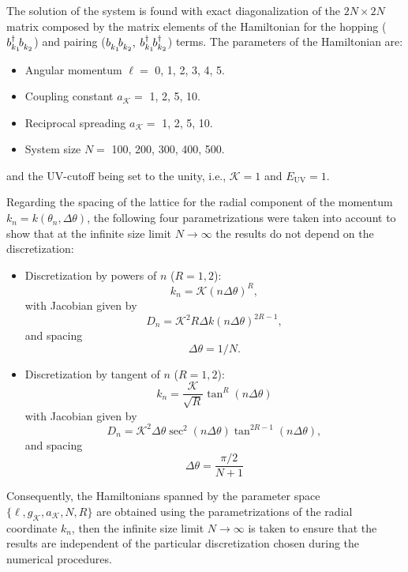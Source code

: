 \documentclass[english,aps,prd,nofootinbib,twocolumn]{revtex4-1}
\begin{document}
The solution of the system is found with exact diagonalization of the $2N\times 2N$ matrix composed by the matrix elements of the Hamiltonian for the hopping ($b^{\textcolor{black}{\dagger}}_{k_{1}}\!b^{\textcolor{white}{\dagger}}_{k_{2}}$) and pairing ($b^{\textcolor{white}{\dagger}}_{k_{1}}\!b^{\textcolor{white}{\dagger}}_{k_{2}},$ $b^{\textcolor{black}{\dagger}}_{k_{1}}\!b^{\textcolor{black}{\dagger}}_{k_{2}}$) terms. The parameters of the Hamiltonian are:
\begin{itemize}
\item Angular momentum $\ell=$ 0, 1, 2, 3, 4, 5.
\item Coupling constant $a_{\mathcal{K}}=$ 1, 2, 5, 10.
\item Reciprocal spreading $a_{\mathcal{K}}=$ 1, 2, 5, 10.
\item System size $N=$ 100, 200, 300, 400, 500.
\end{itemize}
and the UV-cutoff being set to the unity, i.e., $\mathcal{K}=1$ and $E_{\mathrm{UV}}=1$.

Regarding the spacing of the lattice for the radial component of the momentum $k_{n}=k(\theta_{n},\Delta \theta)$, the following four parametrizations were taken into account to show that at the infinite size limit $N\rightarrow \infty$ the results do not depend on the discretization: 
\begin{itemize}
\item Discretization by powers of $n$ ($R=1,2$):
\begin{equation}
\label{eq:Discretization-powers}
k_{n} = \mathcal{K}\left( n \Delta \theta \right)^{R},
\end{equation}
with Jacobian given by
\begin{equation}
D_{n} = \mathcal{K}^{2}R 
\Delta k\left(n\Delta \theta\right)^{2R-1},
\end{equation}
and spacing
\begin{equation}
\Delta \theta = 1/N.
\end{equation}
\item Discretization by tangent of $n$ ($R=1,2$):
\begin{equation}
\label{eq:Discretization-tangents}
k_{n} = \frac{\mathcal{K}}{\sqrt{R}}\tan^{R}
\left(n\Delta \theta\right)
\end{equation}
with Jacobian given by
\begin{equation}
D_{n} = \mathcal{K}^{2} \Delta \theta 
\sec^{2}\left(n\Delta \theta\right)
\tan^{2R-1} \left(n\Delta \theta\right),
\end{equation}
and spacing
\begin{equation}
\Delta \theta = \frac{\pi/2}{N+1}
\end{equation}
\end{itemize}
Consequently, the Hamiltonians spanned by the parameter space $\{\ell,g_{\mathcal{K}},a_{\mathcal{K}},N,R\}$ are obtained using the parametrizations of the radial coordinate $k_{n}$, then the infinite size limit $N\rightarrow \infty$ is taken to ensure that the results are independent of the particular discretization chosen during the numerical procedures.
\end{document}
